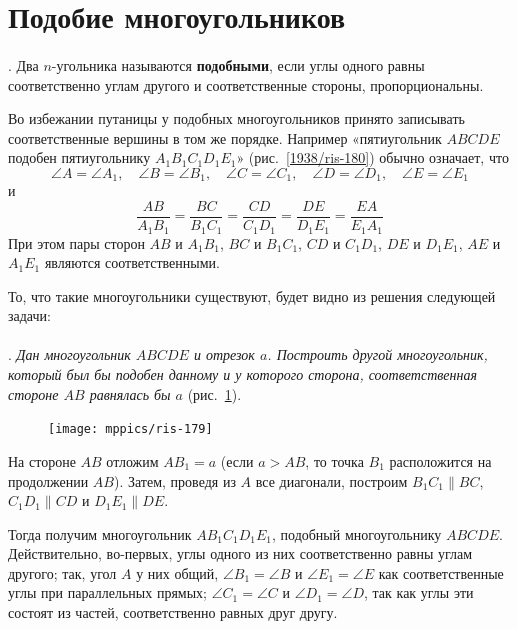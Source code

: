 \documentclass[twoside]{book}
\makeatletter
\newcommand{\rindex}[2][\imki@jobname]{%
  \index[#1]{\detokenize{#2}}%
}
\makeatother
\begin{document}
\section{Подобие многоугольников}

\paragraph{}\label{1938/168}
.
Два $n$-угольника называются \rindex{подобные!многоугольники}\textbf{подобными}, если углы одного равны соответственно углам другого и соответственные стороны, пропорциональны.

{\sloppy 
Во избежании путаницы у подобных многоугольников принято записывать соответственные вершины в том же порядке.
Например «пятиугольник
$ABCDE$ подобен пятиугольнику $A_1B_1C_1D_1E_1$» (рис.~\ref{1938/ris-180}) обычно означает, что  
\[\angle A = \angle A_1, 
\quad
\angle B=\angle B_1,
\quad
\angle C=\angle C_1,
\quad
\angle D=\angle D_1,
\quad
\angle E=\angle E_1\]
и
\[\frac{AB}{A_1B_1}=\frac{BC}{B_1C_1}=\frac{CD}{C_1D_1}=\frac{DE}{D_1E_1}=\frac{EA}{E_1A_1}\]
При этом пары сторон $AB$ и $A_1B_1$, $BC$ и $B_1C_1$, $CD$ и $C_1D_1$, $DE$ и $D_1E_1$, $AE$ и $A_1E_1$
являются соответственными.

}

То, что такие многоугольники существуют, будет видно из решения следующей задачи:

\paragraph{}\label{1938/169}
.
\emph{Дан многоугольник $ABCDE$ и отрезок $a$.
Построить другой многоугольник, который был бы подобен данному и у которого сторона, соответственная стороне $AB$ 
равнялась бы $a$} (рис.~\ref{1938/ris-179}).

\begin{figure}[h]
\centering
\texttt{[image: mppics/ris-179]}
\caption{}\label{1938/ris-179}
\end{figure}

На стороне $AB$ отложим $AB_1=a$ (если $a>AB$, то точка $B_1$ расположится на продолжении $AB$).
Затем, проведя из $A$ все диагонали, построим $B_1C_1 \parallel BC$, $C_1D_1\parallel CD$ и $D_1E_1\parallel DE$.

Тогда получим многоугольник $AB_1C_1D_1E_1$, подобный многоугольнику $ABCDE$.
Действительно, во-первых, углы одного из них соответственно равны углам другого;
так, угол $A$ у них общий, $\angle B_1=\angle B$ и $\angle E_1=\angle E$ как соответственные углы при параллельных прямых;
$\angle C_1=\angle C$ и $\angle D_1=\angle D$, так как углы эти состоят из частей, соответственно равных друг другу.
\end{document}
